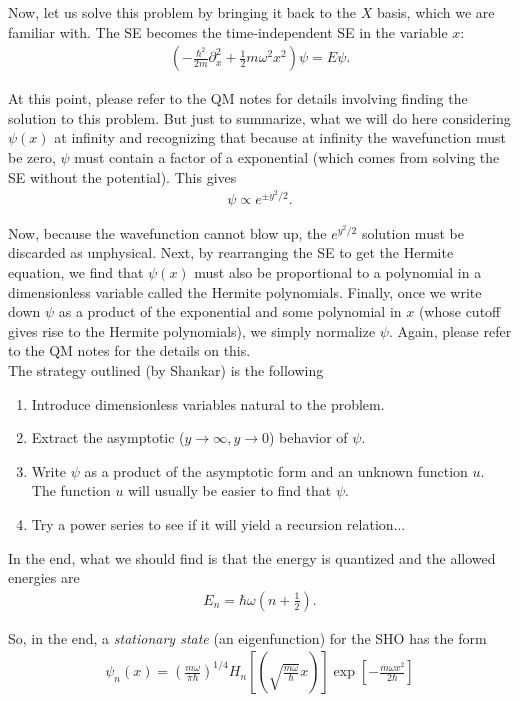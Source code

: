 \documentclass{book}
\theoremstyle{definition}
\newcommand{\p}{\partial}
\newcommand{\f}[2]{\frac{#1}{#2}}
\newcommand{\lp}{\left(}
\newcommand{\rp}{\right)}
\newcommand{\lb}{\left[}
\newcommand{\rb}{\right]}
\begin{document}
Now, let us solve this problem by bringing it back to the $X$ basis, which we are familiar with. The SE becomes the time-independent SE in the variable $x$:
\begin{align}
\lp -\f{\hbar^2}{2m}\p_x^2 + \f{1}{2}m\omega^2x^2\rp \psi = E\psi.
\end{align}

At this point, please refer to the QM notes for details involving finding the solution to this problem. But just to summarize, what we will do here considering $\psi(x)$ at infinity and recognizing that because at infinity the wavefunction must be zero, $\psi$ must contain a factor of a exponential (which comes from solving the SE without the potential). This gives
\begin{align}
\psi \propto e^{\pm y^2/2}.
\end{align}

Now, because the wavefunction cannot blow up, the $e^{y^2/2}$ solution must be discarded as unphysical. Next, by rearranging the SE to get the Hermite equation, we find that $\psi(x)$ must also be proportional to a polynomial in a dimensionless variable called the Hermite polynomials. Finally, once we write down $\psi$ as a product of the exponential and some polynomial in $x$ (whose cutoff gives rise to the Hermite polynomials), we simply normalize $\psi$. Again, please refer to the QM notes for the details on this. \\

The strategy outlined (by Shankar) is the following
\begin{enumerate}
	\item Introduce dimensionless variables natural to the problem.
	\item Extract the asymptotic ($y \to \infty, y\to 0$) behavior of $\psi$.
	\item Write $\psi$ as a product of the asymptotic form and an unknown function $u$. The function $u$ will usually be easier to find that $\psi$.
	\item Try a power series to see if it will yield a recursion relation...  
\end{enumerate}

In the end, what we should find is that the energy is quantized and the allowed energies are
\begin{align}
E_n = \hbar \omega \lp n + \f{1}{2} \rp.
\end{align}


So, in the end, a \textit{stationary state} (an eigenfunction) for the SHO has the form
\begin{align}
\boxed{\psi_n(x) = \lp \f{m\omega}{\pi \hbar} \rp^{1/4} H_n\lb \lp \sqrt{\f{m\omega}{\hbar}} x \rp \rb \exp \lb -\f{m\omega x^2}{2\hbar} \rb}
\end{align}
\end{document}
